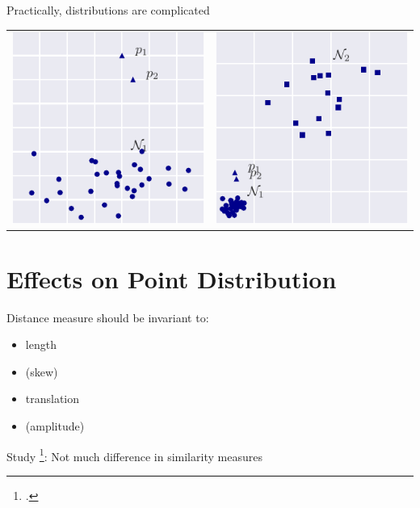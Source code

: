 \documentclass{beamer}
\begin{document}
  \begin{frame}{Practically, distributions are complicated}
    
    \centering
    \begin{tabular}{c|c}
    \includegraphics[width=.45\textwidth]{figs/hard1_dist.pdf} &
    \includegraphics[width=.45\textwidth]{figs/hard2_dist.pdf}
    \end{tabular}

  \end{frame}


  \section{Effects on Point Distribution}


  \begin{frame}{Distance measure should be invariant to:}

    \begin{itemize}
      \item length
      \item (skew)
      \item translation
      \item (amplitude)
    \end{itemize}

    Study \footcite{Wang2013}: Not much difference in similarity measures

  \end{frame}
\end{document}
